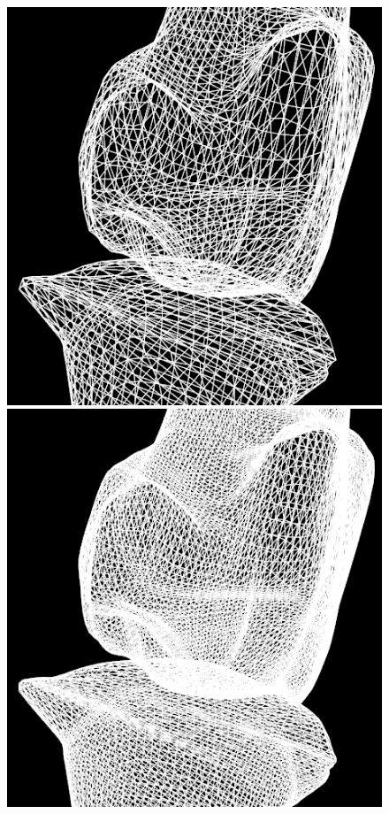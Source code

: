 \documentclass[10pt, conference, compsocconf]{IEEEtran}
\begin{document}
\begin{figure}[htbp]
{\begin{minipage}[h]{0.16\linewidth}
        \includegraphics[width=\textwidth]{./Figure/footbones/fingerBones/butterfly2-.png}\\
        \includegraphics[width=\textwidth]{./Figure/footbones/fingerBones/butterfly3-.png}\vspace{1ex}\\

\end{minipage}}
\end{figure}
\end{document}
